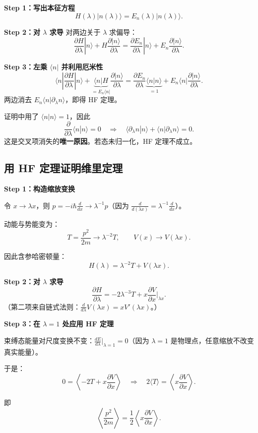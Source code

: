 \begin{derivationbox}
\textbf{Step 1：写出本征方程}
\[
H(\lambda)|n(\lambda)\rangle = E_n(\lambda)|n(\lambda)\rangle.
\]

\textbf{Step 2：对 $\lambda$ 求导}
对两边关于 $\lambda$ 求偏导：
\[
\frac{\partial H}{\partial \lambda}|n\rangle + H\frac{\partial |n\rangle}{\partial \lambda}
=
\frac{\partial E_n}{\partial \lambda}|n\rangle + E_n\frac{\partial |n\rangle}{\partial \lambda}.
\]

\textbf{Step 3：左乘 $\langle n|$ 并利用厄米性}
\[
\langle n|\frac{\partial H}{\partial \lambda}|n\rangle + \underbrace{\langle n|H}_{=E_n\langle n|}\frac{\partial |n\rangle}{\partial \lambda}
=
\frac{\partial E_n}{\partial \lambda}\underbrace{\langle n|n\rangle}_{=1} + E_n\langle n|\frac{\partial |n\rangle}{\partial \lambda}.
\]
两边消去 $E_n\langle n|\partial_\lambda n\rangle$，即得 HF 定理。

\begin{warnbox}[归一化条件的关键作用]
证明中用了 $\langle n|n\rangle = 1$，因此
\[
\frac{\partial}{\partial\lambda}\langle n|n\rangle = 0
\quad\Rightarrow\quad
\langle\partial_\lambda n|n\rangle + \langle n|\partial_\lambda n\rangle = 0.
\]
这是交叉项消失的\textbf{唯一原因}。若态未归一化，HF 定理不成立。
\end{warnbox}
\end{derivationbox}

\subsection{用 HF 定理证明维里定理}

\begin{derivationbox}
\textbf{Step 1：构造缩放变换}

令 $x \to \lambda x$，则 $p = -i\hbar\frac{d}{dx} \to \lambda^{-1}p$（因为 $\frac{d}{d(\lambda x)} = \lambda^{-1}\frac{d}{dx}$）。

动能与势能变为：
\[
T = \frac{p^2}{2m} \to \lambda^{-2}T, \qquad V(x) \to V(\lambda x).
\]

因此含参哈密顿量：
\[
H(\lambda) = \lambda^{-2}T + V(\lambda x).
\]

\textbf{Step 2：对 $\lambda$ 求导}
\[
\frac{\partial H}{\partial \lambda} = -2\lambda^{-3}T + x\frac{\partial V}{\partial x}\bigg|_{\lambda x}.
\]
（第二项来自链式法则：$\frac{d}{d\lambda}V(\lambda x) = xV'(\lambda x)$。）

\textbf{Step 3：在 $\lambda=1$ 处应用 HF 定理}

束缚态能量对尺度变换不变：$\frac{dE}{d\lambda}\big|_{\lambda=1} = 0$（因为 $\lambda=1$ 是物理点，任意缩放不改变真实能量）。

于是：
\[
0 = \left\langle -2T + x\frac{\partial V}{\partial x} \right\rangle
\quad\Rightarrow\quad
\boxed{2\langle T\rangle = \left\langle x\frac{\partial V}{\partial x}\right\rangle}.
\]

即
\[
\left\langle \frac{p^2}{2m}\right\rangle = \frac{1}{2}\left\langle x\frac{\partial V}{\partial x}\right\rangle.
\]
\end{derivationbox}

